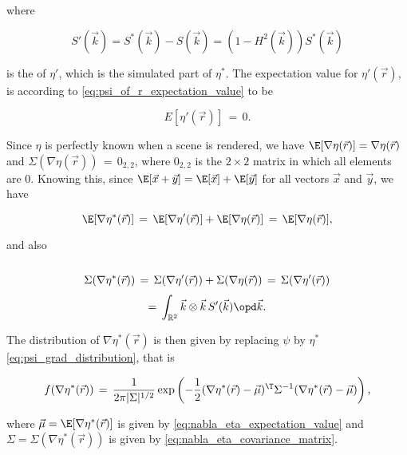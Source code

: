 {where

\begin{equation}
S'(\vec{k}) = S^*(\vec{k}) - S(\vec{k}) = (1-H^2(\vec{k}))S^*(\vec{k})
\end{equation}

is the  of $\eta'$, which is the simulated part of $\eta^*$. The expectation value for $\eta'(\vec{r})$, is according to \eqref{eq:psi_of_r_expectation_value} \assumed to be

\begin{equation}
E[\eta'(\vec{r})] \,=\, 0.
\end{equation}

Since $\eta$ is perfectly known when a scene is rendered, we have $\E[\nabla\eta(\vec{r})] = \nabla\eta(\vec{r})$ and $\Sigma(\nabla\eta(\vec{r})) \,=\, 0_{2,2}$, where $0_{2,2}$ is the $2\times 2$ matrix in which all elements are 0. Knowing this, since $\E[\vec{x}+\vec{y}] = \E[\vec{x}]+\E[\vec{y}]$ for all vectors $\vec{x}$ and $\vec{y}$, we have

\begin{equation} \label{eq:nabla_eta_expectation_value}
\E[\nabla\eta^*(\vec{r})] \,=\, \E[\nabla\eta'(\vec{r})] + \E[\nabla\eta(\vec{r})] \,=\, \E[\nabla\eta(\vec{r})],
\end{equation}

and also

\begin{equation} \label{eq:nabla_eta_covariance_matrix}
\renewcommand*{\arraystretch}{2}
\begin{array}{c}
\displaystyle \Sigma(\nabla\eta^*(\vec{r})) \,=\, \Sigma(\nabla\eta'(\vec{r})) + \Sigma(\nabla\eta(\vec{r})) \,=\, \Sigma(\nabla\eta'(\vec{r})) \\
\displaystyle =\, \int_{\mathbb{R}^2}\vec{k}\otimes\vec{k}\,S'(\vec{k})\opd\vec{k}.
\end{array}
\end{equation}

The distribution of $\nabla\eta^*(\vec{r})$ is then given by replacing $\psi$ by $\eta^*$ \eqref{eq:psi_grad_distribution}, that is

\begin{equation} \label{eq:eta_grad_distribution_r_uniformly_distributed}
f(\nabla\eta^*(\vec{r})) \,=\, \frac{1}{2\pi|\Sigma|^{1/2}}\exp\left(-\frac{1}{2}(\nabla\eta^*(\vec{r})-\vec{\mu})^{\T}\Sigma^{-1}(\nabla\eta^*(\vec{r})-\vec{\mu})\right),
\end{equation}

where $\vec{\mu} = \E[\nabla\eta^*(\vec{r})]$ is given by \eqref{eq:nabla_eta_expectation_value} and $\Sigma = \Sigma(\nabla\eta^*(\vec{r}))$ is given by \eqref{eq:nabla_eta_covariance_matrix}.

}
